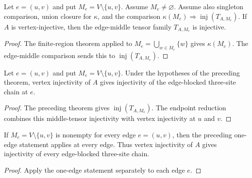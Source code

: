 \begin{theorem}%
    \label{thm:peps_edgeMiddleTensorInjective_of_singletons}
    \leanok
    Let $e=(u,v)$ and put $M_e=V\setminus\{u,v\}$. Assume $M_e\ne\varnothing$.
    Assume also singleton comparison, union closure for $\kappa$, and the
    comparison
    $\kappa(M_e)\Longrightarrow\operatorname{inj}(T_{A,M_e})$. If $A$ is
    vertex-injective, then the edge-middle tensor family $T_{A,M_e}$ is
    injective.
\end{theorem}
\begin{proof}\leanok
    The finite-region theorem applied to
    $M_e=\bigcup_{w\in M_e}\{w\}$ gives $\kappa(M_e)$. The edge-middle
    comparison sends this to $\operatorname{inj}(T_{A,M_e})$.
\end{proof}

\begin{theorem}%
    \label{thm:peps_edgeBlockedThreeSiteInjective_of_singletons}
    \leanok
    Let $e=(u,v)$ and put $M_e=V\setminus\{u,v\}$. Under the hypotheses of the
    preceding theorem, vertex injectivity of $A$ gives injectivity of the
    edge-blocked three-site chain at $e$.
\end{theorem}
\begin{proof}\leanok
    The preceding theorem gives $\operatorname{inj}(T_{A,M_e})$. The endpoint
    reduction combines this middle-tensor injectivity with vertex injectivity
    at $u$ and $v$.
\end{proof}

\begin{theorem}%
    \label{thm:peps_edgeBlockedThreeSiteInjective_all_of_singletons}
    \leanok
    If $M_e=V\setminus\{u,v\}$ is nonempty for every edge $e=(u,v)$, then the
    preceding one-edge statement applies at every edge. Thus vertex
    injectivity of $A$ gives injectivity of every edge-blocked three-site
    chain.
\end{theorem}
\begin{proof}\leanok
    Apply the one-edge statement separately to each edge $e$.
\end{proof}

